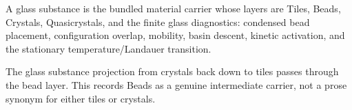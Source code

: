 \begin{proposition}\label{thm:glass-substance-bundle}\leanok{}
A glass substance is the bundled material carrier whose layers are
Tiles, Beads, Crystals, Quasicrystals, and the finite glass diagnostics:
condensed bead placement, configuration overlap, mobility, basin descent,
kinetic activation, and the stationary temperature/Landauer transition.
\end{proposition}

\begin{theorem}\label{thm:glass-beads-between-tiles-and-crystals}\leanok{}
The glass substance projection from crystals back down to tiles passes through
the bead layer.  This records Beads as a genuine intermediate carrier, not a
prose synonym for either tiles or crystals.
\end{theorem}

